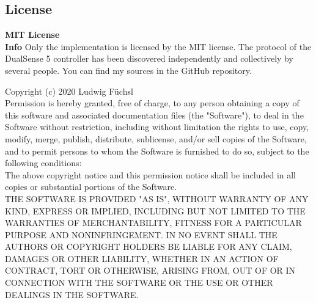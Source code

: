 \subsection{License}
\textbf{MIT License}\\

\textbf{Info} Only the implementation is licensed by the MIT license. The protocol of the DualSense 5 controller has been discovered independently and collectively by several people. You can find my sources in the GitHub repository.

Copyright (c) 2020 Ludwig Füchsl\\

Permission is hereby granted, free of charge, to any person obtaining a copy of this software and associated documentation files (the "Software"), to deal in the Software without restriction, including without limitation the rights to use, copy, modify, merge, publish, distribute, sublicense, and/or sell copies of the Software, and to permit persons to whom the Software is furnished to do so, subject to the following conditions:\\

The above copyright notice and this permission notice shall be included in all copies or substantial portions of the Software.\\

THE SOFTWARE IS PROVIDED "AS IS", WITHOUT WARRANTY OF ANY KIND, EXPRESS OR IMPLIED, INCLUDING BUT NOT LIMITED TO THE WARRANTIES OF MERCHANTABILITY, FITNESS FOR A PARTICULAR PURPOSE AND NONINFRINGEMENT. IN NO EVENT SHALL THE AUTHORS OR COPYRIGHT HOLDERS BE LIABLE FOR ANY CLAIM, DAMAGES OR OTHER LIABILITY, WHETHER IN AN ACTION OF CONTRACT, TORT OR OTHERWISE, ARISING FROM, OUT OF OR IN CONNECTION WITH THE SOFTWARE OR THE USE OR OTHER DEALINGS IN THE SOFTWARE.

\newpage